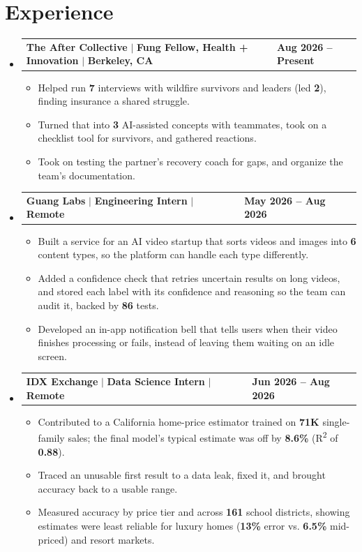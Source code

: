 \documentclass[letterpaper,11pt]{article}
\makeatletter
\newcommand{\resumeItem}[1]{
  \item\small{
    {#1 \vspace{-2pt}}
  }
}
\newcommand{\resumeCompactHeading}[4]{
  \vspace{-1pt}\item
    \begin{tabularx}{1.0\textwidth}[t]{@{}X@{}>{\raggedright\arraybackslash}p{1.5in}@{}}
      \textbf{#1} $|$ \textbf{#2} $|$ \textbf{\small #3} & \textbf{\small #4} \\
    \end{tabularx}\vspace{-3pt}
}
\newcommand{\resumeSubHeadingListStart}{\begin{itemize}[leftmargin=0.0in, label={}]}
\newcommand{\resumeSubHeadingListEnd}{\end{itemize}}
\newcommand{\resumeItemListStart}{\begin{itemize}[itemsep=2.5pt, topsep=3pt]}
\newcommand{\resumeItemListEnd}{\end{itemize}\vspace{-4pt}}
\makeatother
\begin{document}
\section{Experience}
  \resumeSubHeadingListStart

    \resumeCompactHeading
        {The After Collective}{Fung Fellow, Health + Innovation}{Berkeley, CA}{Aug 2026 -- Present}
        \resumeItemListStart
            \resumeItem{Helped run \textbf{7} interviews with wildfire survivors and leaders (led \textbf{2}), finding insurance a shared struggle.}
            \resumeItem{Turned that into \textbf{3} AI-assisted concepts with teammates, took on a checklist tool for survivors, and gathered reactions.}
            \resumeItem{Took on testing the partner's recovery coach for gaps, and organize the team's documentation.}
        \resumeItemListEnd

    \resumeCompactHeading
        {Guang Labs}{Engineering Intern}{Remote}{May 2026 -- Aug 2026}
        \resumeItemListStart
            \resumeItem{Built a service for an AI video startup that sorts videos and images into \textbf{6} content types, so the platform can handle each type differently.}
            \resumeItem{Added a confidence check that retries uncertain results on long videos, and stored each label with its confidence and reasoning so the team can audit it, backed by \textbf{86} tests.}
            \resumeItem{Developed an in-app notification bell that tells users when their video finishes processing or fails, instead of leaving them waiting on an idle screen.}
        \resumeItemListEnd

    \resumeCompactHeading
        {IDX Exchange}{Data Science Intern}{Remote}{Jun 2026 -- Aug 2026}
        \resumeItemListStart
            \resumeItem{Contributed to a California home-price estimator trained on \textbf{71K} single-family sales; the final model's typical estimate was off by \textbf{8.6\%} (R\textsuperscript{2} of \textbf{0.88}).}
            \resumeItem{Traced an unusable first result to a data leak, fixed it, and brought accuracy back to a usable range.}
            \resumeItem{Measured accuracy by price tier and across \textbf{161} school districts, showing estimates were least reliable for luxury homes (\textbf{13\%} error vs. \textbf{6.5\%} mid-priced) and resort markets.}
        \resumeItemListEnd

  \resumeSubHeadingListEnd
\vspace{-12pt}

\end{document}

